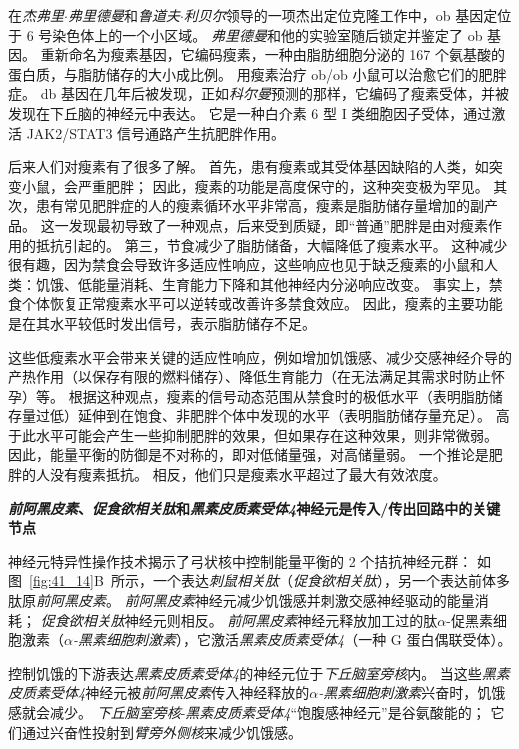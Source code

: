 在\textit{杰弗里$\cdot$弗里德曼}和\textit{鲁道夫$\cdot$利贝尔}领导的一项杰出定位克隆工作中，ob 基因定位于 6 号染色体上的一个小区域。
\textit{弗里德曼}和他的实验室随后锁定并鉴定了 ob 基因。
重新命名为瘦素基因，它编码瘦素，一种由脂肪细胞分泌的 167 个氨基酸的蛋白质，与脂肪储存的大小成比例。
用瘦素治疗 ob/ob 小鼠可以治愈它们的肥胖症。
db 基因在几年后被发现，正如\textit{科尔曼}预测的那样，它编码了瘦素受体，并被发现在下丘脑的神经元中表达。
它是一种白介素 6 型 I 类细胞因子受体，通过激活 JAK2/STAT3 信号通路产生抗肥胖作用。


后来人们对瘦素有了很多了解。
首先，患有瘦素或其受体基因缺陷的人类，如突变小鼠，会严重肥胖；
因此，瘦素的功能是高度保守的，这种突变极为罕见。
其次，患有常见肥胖症的人的瘦素循环水平非常高，瘦素是脂肪储存量增加的副产品。
这一发现最初导致了一种观点，后来受到质疑，即“普通”肥胖是由对瘦素作用的抵抗引起的。
第三，节食减少了脂肪储备，大幅降低了瘦素水平。
这种减少很有趣，因为禁食会导致许多适应性响应，这些响应也见于缺乏瘦素的小鼠和人类：饥饿、低能量消耗、生育能力下降和其他神经内分泌响应改变。
事实上，禁食个体恢复正常瘦素水平可以逆转或改善许多禁食效应。
因此，瘦素的主要功能是在其水平较低时发出信号，表示脂肪储存不足。


这些低瘦素水平会带来关键的适应性响应，例如增加饥饿感、减少交感神经介导的产热作用（以保存有限的燃料储存）、降低生育能力（在无法满足其需求时防止怀孕）等。
根据这种观点，瘦素的信号动态范围从禁食时的极低水平（表明脂肪储存量过低）延伸到在饱食、非肥胖个体中发现的水平（表明脂肪储存量充足）。
高于此水平可能会产生一些抑制肥胖的效果，但如果存在这种效果，则非常微弱。
因此，能量平衡的防御是不对称的，即对低储量强，对高储量弱。
一个推论是肥胖的人没有瘦素抵抗。
相反，他们只是瘦素水平超过了最大有效浓度。


\textbf{\textit{前阿黑皮素}、\textit{促食欲相关肽}和\textit{黑素皮质素受体4}神经元是传入/传出回路中的关键节点}

神经元特异性操作技术揭示了弓状核中控制能量平衡的 2 个拮抗神经元群：
如图~\ref{fig:41_14}B~所示，一个表达\textit{刺鼠相关肽}（\textit{促食欲相关肽}），另一个表达前体多肽原\textit{前阿黑皮素}。
\textit{前阿黑皮素}神经元减少饥饿感并刺激交感神经驱动的能量消耗；
\textit{促食欲相关肽}神经元则相反。
\textit{前阿黑皮素}神经元释放加工过的肽$\alpha$-促黑素细胞激素（\textit{$\alpha$-黑素细胞刺激素}），它激活\textit{黑素皮质素受体4}（一种 G 蛋白偶联受体）。


控制饥饿的下游表达\textit{黑素皮质素受体4}的神经元位于\textit{下丘脑室旁核}内。
当这些\textit{黑素皮质素受体4}神经元被\textit{前阿黑皮素}传入神经释放的\textit{$\alpha$-黑素细胞刺激素}兴奋时，饥饿感就会减少。
\textit{下丘脑室旁核}-\textit{黑素皮质素受体4}“饱腹感神经元”是谷氨酸能的；
它们通过兴奋性投射到\textit{臂旁外侧核}来减少饥饿感。


